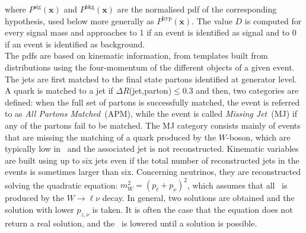 where $P^{\text{sig}}(\textbf{x})$ and $P^{\text{bkg}}(\textbf{x})$ are the normalised pdf of the corresponding hypothesis, used below more generally as $P^{\text{hyp}}(\textbf{x})$. The value $D$ is computed for every signal mass and approaches to 1 if an event is identified as signal and to 0 if an event is identified as background.\\

The pdfs are based on kinematic information, from templates built from distributions using the four-momentum of the different objects of a given event. The jets are first matched to the final state partons identified at generator level. A quark is matched to a jet if $\Delta R$(jet,parton)$\leq 0.3$ and then, two categories are defined: when the full set of partons is successfully matched, the event is referred to as \textit{All Partons Matched}~(APM), while the event is called \textit{Missing Jet}~(MJ) if any of the partons fail to be matched. The MJ category consists mainly of events that are missing the matching of a quark produced by the $W$-boson, which are typically low in \pT\ and the associated jet is not reconstructed. Kinematic variables are built using up to six jets even if the total number of reconstructed jets in the events is sometimes larger than six. %
Concerning neutrinos, they are reconstructed solving the quadratic equation: $m_W^2 = (p_\ell + p_\nu)^2$, which assumes that all \MET\ is produced by the $W\to\ell\nu$ decay. In general, two solutions are obtained and the solution with lower $p_{z,\nu}$ is taken. It is often the case that the equation does not return a real solution, and the \MET\ is lowered until a solution is possible.\\

